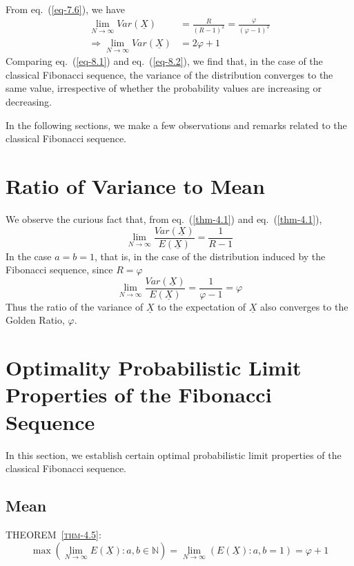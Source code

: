 \begin{multicols}{2}
From eq.~(\ref{eq-7.6}), we have
\begin{align}
\displaystyle{\lim_{N \rightarrow \infty}}Var(\underline{X}) &= \frac{R}{(R-1)^2} =\frac{\varphi}{(\varphi-1)^2} \nonumber \\
\Rightarrow \displaystyle{\lim_{N \rightarrow \infty}}Var(\underline{X}) &= 2\varphi + 1\label{eq-8.2}
\end{align}
Comparing eq.~(\ref{eq-8.1}) and eq.~(\ref{eq-8.2}), we find that, in the case of the classical Fibonacci sequence, the variance of the distribution converges to the same value, irrespective of whether the probability values are increasing or decreasing.

In the following sections, we make a few observations and remarks related to the classical Fibonacci sequence.

\vspace{-.3cm}

\section{Ratio of Variance to Mean}\label{section-9}
We observe the curious fact that, from eq.~(\ref{thm-4.1}) and eq.~(\ref{thm-4.1}),
\begin{equation}
\lim_{N\rightarrow \infty} \frac{Var(\underline{X})}{E(\underline{X})} = \frac{1}{R-1}\label{eq-9.1}
\end{equation}
In the case $a = b = 1$, that is, in the case of the distribution induced by the Fibonacci sequence, since $R = \varphi$
\begin{equation}
\lim_{N\rightarrow \infty} \frac{Var(\underline{X})}{E(\underline{X})} = \frac{1}{\varphi-1} = \varphi\label{eq-9.2}
\end{equation}
Thus the ratio of the variance of $\underline{X}$ to the expectation of $\underline{X}$ also converges to the Golden Ratio, $\varphi$.

\section{Optimality Probabilistic Limit\\ Properties of the Fibonacci\\ Sequence}\label{section-10}
In this section, we establish certain optimal probabilistic limit properties of the classical Fibonacci sequence. 

\subsection{Mean}\label{subsection-10.1}
\textsc{THEOREM~{\ref{thm-4.5}}:}
{\fontsize{8}{9}\selectfont\begin{equation*}
\max{\left(\lim_{N\rightarrow \infty} E(\underline{X}): a, b \in \mathbb N\right)} = \lim_{N \rightarrow \infty}\left(E(\underline{X}) : a,b = 1\right) = \varphi + 1
\end{equation*}}


\end{multicols}
